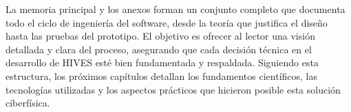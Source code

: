 La memoria principal y los anexos forman un conjunto completo que documenta todo el ciclo de ingeniería del software, desde la teoría que justifica el diseño hasta las pruebas del prototipo. El objetivo es ofrecer al lector una visión detallada y clara del proceso, asegurando que cada decisión técnica en el desarrollo de HIVES esté bien fundamentada y respaldada. Siguiendo esta estructura, los próximos capítulos detallan los fundamentos científicos, las tecnologías utilizadas y los aspectos prácticos que hicieron posible esta solución ciberfísica.
